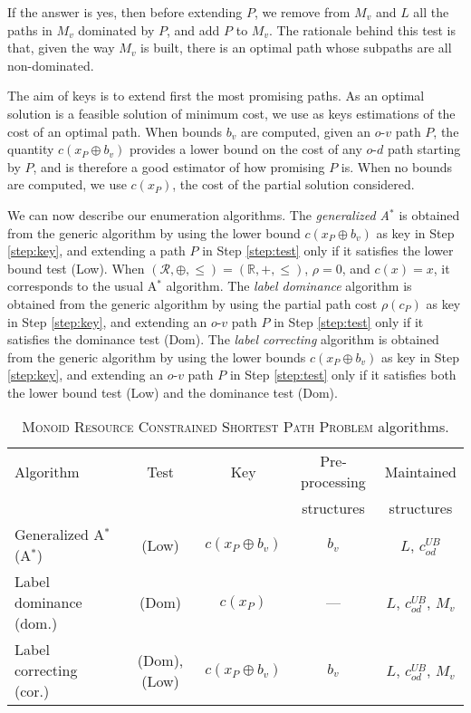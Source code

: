 \documentclass[11pt]{amsart}
\theoremstyle{plain}
\theoremstyle{remark}
\def\R{\mathbb{R}}
\newcommand{\MRCSP}{\textsc{Monoid Resource Constrained Shortest Path Problem}\xspace}
\newcommand{\rplus}{\oplus}
\newcommand{\rleq}{\leqslant}
\newcommand{\rset}{\mathcal{R}}
\newcommand{\rcost}{c}
\newcommand{\rmeas}{\rho}
\newcommand{\re}{x}
\begin{document}
\noindent 
If the answer is yes, then before extending $P$, we remove from $M_{v}$ and $L$ all the paths in $M_{v}$ dominated by $P$, and add $P$ to $M_{v}$. 
The rationale behind this test is that, given the way $M_{v}$ is built, there is an optimal path whose subpaths are all non-dominated.

The aim of keys is to extend first the most promising paths. As an optimal solution is a feasible solution of minimum cost, we use as keys estimations of the cost of an optimal path. When bounds $b_{v}$ are computed, given an $o$-$v$ path $P$, the quantity $\rcost(\re_{P}\rplus b_{v})$ provides a lower bound on the cost of any $o$-$d$ path starting by $P$, and is therefore a good estimator of how promising $P$ is. When no bounds are computed, we use $\rcost(\re_{P})$, the cost of the partial solution considered.

We can now describe our enumeration algorithms.  The \emph{generalized A$^{*}$} is obtained from the generic algorithm by using the lower bound $\rcost(\re_{P}\rplus b_{v})$ as key in Step \ref{step:key}, and extending a path $P$ in Step \ref{step:test} only if it satisfies the lower bound test (Low). When $(\rset,\rplus,\rleq) = (\R,+,\leq)$, $\rmeas = 0$, and $\rcost(x) = x$, it corresponds to the usual A$^{*}$ algorithm. The \emph{label dominance} algorithm is obtained from the generic algorithm by using the partial path cost $\rho(c_{P})$ as key in Step \ref{step:key}, and extending an $o$-$v$ path $P$ in Step \ref{step:test} only if it satisfies the dominance test (Dom). The \emph{label correcting} algorithm is obtained from the generic algorithm by using the lower bounds $\rcost(\re_{P}\rplus b_{v})$ as key in Step \ref{step:key}, and extending an $o$-$v$ path $P$ in Step \ref{step:test} only if it satisfies both the lower bound test (Low) and the dominance test (Dom).

\begin{table}
	\begin{tabular}{p{4.2cm}cccc}
	\hline
	Algorithm & Test & Key & Pre-processing & Maintained \\
	&&& structures & structures \\
	\hline
	Generalized A$^{*}$ (A$^{*}$) & (Low) & $\rcost(\re_{P} \rplus b_{v})$ & $b_{v}$ & $L$, $c_{od}^{UB}$ \\
	Label dominance (dom.) & (Dom) &$ \rcost(\re_{P})$ & --- & $L$, $c_{od}^{UB}$, $M_{v}$\\
Label correcting (cor.) & (Dom), (Low) &$ \rcost(\re_{P}\rplus b_{v})$ & $b_{v}$ & $L$, $c_{od}^{UB}$, $M_{v}$\\
	\hline
	\end{tabular}
	\caption{\MRCSP algorithms.}
	\label{tab:mrcspAlgo}
\end{table}
\end{document}
